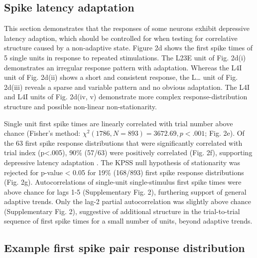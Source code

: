 \documentclass{article}
\begin{document}
\subsection*{Spike latency adaptation}


This section demonstrates that the responses of some neurons exhibit depressive latency adaption, which should be controlled for when testing for correlative structure caused by a non-adaptive state. Figure 2d shows the first spike times of 5 single units in response to repeated stimulations. The L23E unit of Fig. 2d(i) demonstrates an irregular response pattern with adaptation. Whereas the L4I unit of Fig. 2d(ii) shows a short and consistent response, the L… unit of Fig. 2d(iii) reveals a sparse and variable pattern and no obvious adaptation. The L4I and L4I units of Fig. 2d(iv, v) demonstrate more complex response-distribution structure and possible non-linear non-stationarity. 

Single unit first spike times are linearly correlated with trial number above chance (Fisher's method: $\chi^{2} (1786, N = 893) = 3672.69, p<.001$; Fig. 2e).
Of the 63 first spike response distributions that were significantly correlated with trial index (p<.005), $90\%$ (57/63) were positively correlated (Fig. 2f), supporting depressive latency adaptation \cite{ahissar2000transformation, ahissar2001temporal, kheradpezhouh2017response}. The KPSS null hypothesis of stationarity was rejected for p-value < 0.05 for 19\% (168/893) first spike response distributions (Fig. 2g). Autocorrelations of single-unit single-stimulus first spike times were above chance for lags 1-5 (Supplementary Fig. 2), furthering support of general adaptive trends. Only the lag-2 partial autocorrelation was slightly above chance (Supplementary Fig. 2), suggestive of additional structure in the trial-to-trial sequence of first spike times for a small number of units, beyond adaptive trends.


\subsection*{Example first spike pair response distribution}
\end{document}
